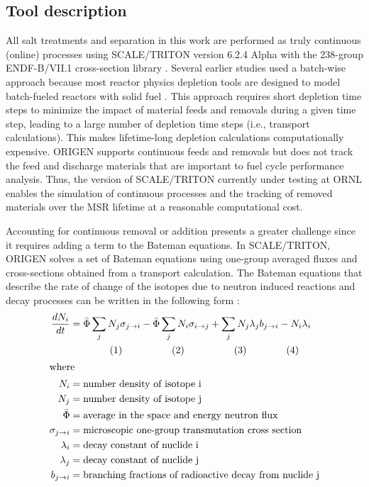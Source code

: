 \documentclass[letterpaper]{mandc2019}
\begin{document}
\subsection{Tool description}
All salt treatments and separation in this work are performed as truly continuous (online) processes using SCALE/TRITON version 6.2.4 Alpha \cite{betzler_implementation_2017-1} with the 238-group ENDF-B/VII.1 cross-section library \cite{rearden_scale_2016}. Several earlier studies used a batch-wise approach because most reactor physics depletion tools are designed to model batch-fueled reactors with solid fuel \cite{betzler_molten_2017,rykhlevskii_online_2017,rykhlevskii_modeling_2019}. This approach requires short depletion time steps to minimize the impact of material feeds and removals during a given time step, leading to a large number of depletion time steps (i.e., transport calculations). This makes lifetime-long depletion calculations computationally expensive. ORIGEN \cite{gauld_isotopic_2011} supports continuous feeds and removals but does not track the feed and discharge materials that are important to fuel cycle performance analysis. Thus, the version of SCALE/TRITON currently under testing at \gls{ORNL} enables the simulation of continuous processes and the tracking of removed materials over the \gls{MSR} lifetime at a reasonable computational cost.

Accounting for continuous removal or addition presents a greater challenge 
since it 
requires adding a term to the Bateman equations. In SCALE/TRITON, 
ORIGEN \cite{gauld_isotopic_2011} solves a set of Bateman equations using 
one-group averaged fluxes and cross-sections obtained from a transport 
calculation. The Bateman equations that describe the rate of change of the 
isotopes due to neutron induced reactions and decay processes can be 
written in the following form \cite{aufiero_extended_2013}:
\begin{align} \label{eq:bateman}
\frac{dN_i}{dt} &= \bar{\Phi}\sum\limits_{j}N_{j}\sigma_{j \rightarrow 		i} - \bar{\Phi}\sum\limits_{j}N_{i}\sigma_{i \rightarrow j} + \sum					\limits_{j}	N_{j}\lambda_{j}b_{j \rightarrow i} - N_{i}\lambda_{i} \\
& \qquad\qquad (1) \qquad\qquad\quad (2) \qquad\quad\qquad (3) \qquad\qquad (4) \nonumber  \\
	\intertext{where} 
	N_i &= \mbox{number density of isotope i}  \nonumber \\
	N_j &= \mbox{number density of isotope j}  \nonumber \\
	\bar{\Phi} &= \mbox {average in the space and energy neutron flux}  \nonumber \\
	\sigma_{j \rightarrow i} &= \mbox{microscopic one-group transmutation cross section}  \nonumber \\
	\lambda_i &= \mbox{decay constant of nuclide i}  \nonumber \\
	\lambda_j &= \mbox{decay constant of nuclide j}  \nonumber \\
	b_{j \to i} &= \mbox{branching fractions of radioactive decay from nuclide j}  \nonumber
\end{align}
\end{document}
